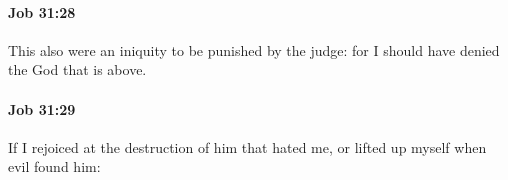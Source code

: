 		\paragraph{Job 31:28} %
			\label{JOB-31-28}

			This also were an iniquity to be punished by the judge: for I should have denied the God that is above.


		\paragraph{Job 31:29} %
			\label{JOB-31-29}

			If I rejoiced at the destruction of him that hated me, or lifted up myself when evil found him:


